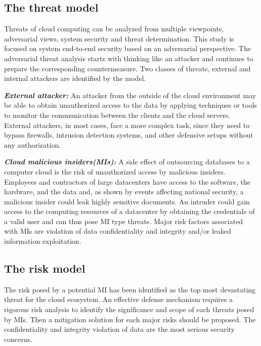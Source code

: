 \subsection{The threat model}

Threats of cloud computing can be analyzed from multiple viewpoints, adversarial views, system security and threat determination. This study is focused on system end-to-end security based on an adversarial perspective. The adversarial threat analysis starts with thinking like an attacker and continues to prepare the corresponding countermeasure. Two classes of threats, external and internal attackers are identified by the model. 

\smallskip


\noindent \textbf{\textit{External attacker:}} An attacker from the outside of the cloud environment may be able to obtain unauthorized access to the data by applying techniques or tools to monitor the communication between the clients and the cloud servers. External attackers, in most cases, face a more complex task, since they need to bypass firewalls, intrusion detection systems, and other defensive setups without any authorization.

\smallskip 

\noindent \textbf{\textit{Cloud malicious insiders(MIs):}} A side effect of outsourcing databases  to a computer cloud is the risk of unauthorized access by malicious insiders.  Employees and contractors of large datacenters have access to the software, the hardware, and the data  and, as shown by events affecting national security,  a malicious insider could leak highly sensitive documents. An intruder could gain access to the computing resources of a datacenter  by  obtaining the credentials of a valid user and can thus pose MI type threats. Major risk factors associated with MIs are violation of data confidentiality and integrity and/or leaked information exploitation.

\subsection{The risk model}
\label{MaliciousInsiderModelSubSec}

The risk posed by a potential MI has been identified as the top most devastating threat for the cloud ecosystem.  An effective defense mechanism requires  a rigorous  risk analysis to  identify the  significance and scope of each threats posed by MIs. Then a  mitigation solution for each major risks should be proposed. The confidentiality and integrity violation of data are the most serious security concerns. 

